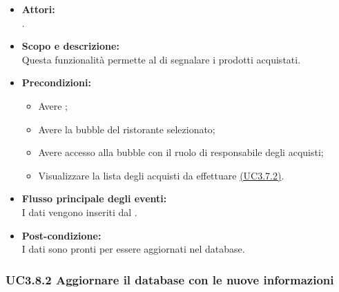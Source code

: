 \begin{itemize}
	\item \textbf{Attori:}
	\\.
	\item \textbf{Scopo e descrizione:} 
	\\Questa funzionalità permette al  di segnalare i prodotti acquistati.
	\item \textbf{Precondizioni:}
	\begin{itemize}
		\item Avere ;
		\item Avere la bubble del ristorante selezionato;
		\item Avere accesso alla bubble con il ruolo di responsabile degli acquisti;
		\item Visualizzare la lista degli acquisti da effettuare \hyperref[UC3.7.2]{(UC3.7.2)}.
	\end{itemize}
	\item \textbf{Flusso principale degli eventi:}
	\\I dati vengono inseriti dal .
	\item \textbf{Post-condizione:}
	\\I dati sono pronti per essere aggiornati nel database.
\end{itemize}

\subsubsection{UC3.8.2 Aggiornare il database con le nuove informazioni} \label{UC3.8.2}

